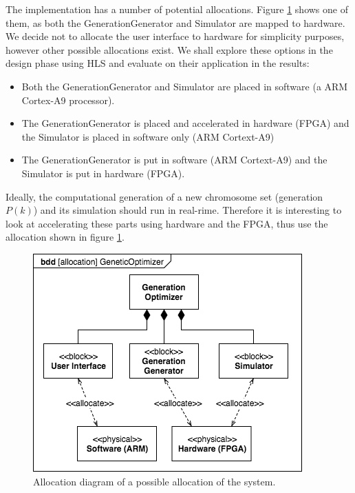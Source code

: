 The implementation has a number of potential allocations. Figure \ref{fig:allocation} shows one of them, as both the GenerationGenerator and Simulator are mapped to hardware. We decide not to allocate the user interface to hardware for simplicity purposes, however other possible allocations exist. We shall explore these options in the design phase using HLS and evaluate on their application in the results:

\begin{itemize} 
	\item Both the GenerationGenerator and Simulator are placed in software (a ARM Cortex-A9 processor).
	\item The GenerationGenerator is placed and accelerated in hardware (FPGA) and the Simulator is placed in software only (ARM Cortext-A9)
	\item The GenerationGenerator is put in software (ARM Cortext-A9) and the Simulator is put in hardware (FPGA).
\end{itemize}

Ideally, the computational generation of a new chromosome set (generation $P(k)$) and its simulation should run in real-rime. Therefore it is interesting to look at accelerating these parts using hardware and the FPGA, thus use the allocation shown in figure \ref{fig:allocation}.

\begin{figure}[h!]
	\centering
	\includegraphics[width=0.9\linewidth]{../diagrams/allocation.png}
	\caption{Allocation diagram of a possible allocation of the system.}
	\label{fig:allocation}
\end{figure}


